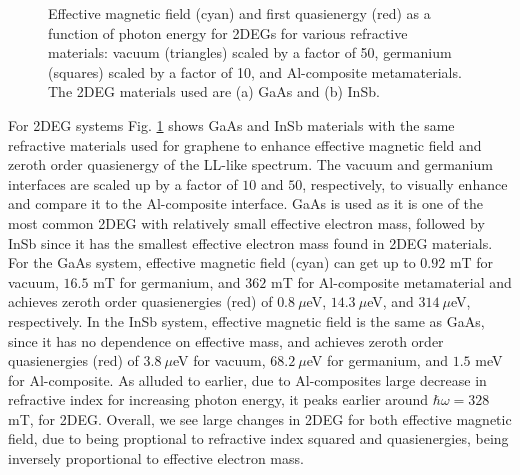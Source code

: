 \begin{figure}
  \caption{Effective magnetic field (cyan) and first quasienergy (red) as a function of photon energy for 2DEGs for various refractive materials: vacuum (triangles) scaled by a factor of 50, germanium (squares) scaled by a factor of 10, and Al-composite metamaterials. The 2DEG materials used are (a) GaAs and (b) InSb.}
  \label{fig:2deg-bfield-energy}
\end{figure}

For 2DEG systems Fig. \ref{fig:2deg-bfield-energy} shows GaAs and InSb materials with the same refractive materials used for graphene to enhance effective magnetic field and zeroth order quasienergy of the LL-like spectrum.
The vacuum and germanium interfaces are scaled up by a factor of $10$ and $50$, respectively, to visually enhance and compare it to the Al-composite interface.
GaAs is used as it is one of the most common 2DEG with relatively small effective electron mass, followed by InSb since it has the smallest effective electron mass found in 2DEG materials.
For the GaAs system, effective magnetic field (cyan) can get up to $0.92$ mT for vacuum, $16.5$ mT for germanium, and $362$ mT for Al-composite metamaterial and achieves zeroth order quasienergies (red) of $0.8\ \mu$eV, $14.3\ \mu$eV, and $314\ \mu$eV, respectively.
In the InSb system, effective magnetic field is the same as GaAs, since it has no dependence on effective mass, and achieves zeroth order quasienergies (red) of $3.8\ \mu$eV for vacuum, $68.2\ \mu$eV for germanium, and $1.5$ meV for Al-composite.
As alluded to earlier, due to Al-composites large decrease in refractive index for increasing photon energy, it peaks earlier around $\hbar\omega=328$ mT, for 2DEG.
Overall, we see large changes in 2DEG for both effective magnetic field, due to being proptional to refractive index squared and quasienergies, being inversely proportional to effective electron mass.

